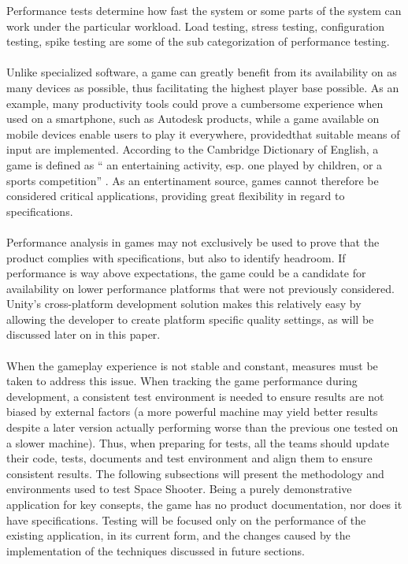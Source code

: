 Performance tests determine how fast the system or some parts of the system can work under the particular workload. Load testing, stress testing, configuration testing, spike testing are some of the sub categorization of performance testing. \cite{testingarticle} \\ \\
Unlike specialized software, a game can greatly benefit from its availability on as many devices as possible, thus facilitating the highest player base possible. As an example, many productivity tools could prove a cumbersome experience when used on a smartphone, such as Autodesk products, while a game available on mobile devices enable users to play it everywhere, providedthat suitable means of input are implemented. According to the Cambridge Dictionary of English, a game is defined as `` an entertaining activity, esp. one played by children, or a sports competition'' \cite{gamedef}. As an entertinament source, games cannot therefore be considered critical applications, providing great flexibility in regard to specifications. \\ \\
Performance analysis in games may not exclusively be used to prove that the product complies with specifications, but also to identify headroom. If performance is way above expectations, the game could be a candidate for availability on lower performance platforms that were not previously considered. Unity's cross-platform development solution makes this relatively easy by allowing the developer to create platform specific quality settings, as will be discussed later on in this paper.\\ \\
When the gameplay experience is not stable and constant, measures must be taken to address this issue. When tracking the game performance during development, a consistent test environment is needed to ensure results are not biased by external factors (a more powerful machine may yield better results despite a later version actually performing worse than the previous one tested on a slower machine). Thus, when preparing for tests, all the teams should update their code, tests, documents and test environment and align them \cite{gamedef} to ensure consistent results.
The following subsections will present the methodology and environments used to test Space Shooter. Being a purely demonstrative application for key consepts, the game has no product documentation, nor does it have specifications. Testing will be focused only on the performance of the existing application, in its current form, and the changes caused by the implementation of the techniques discussed in future sections.